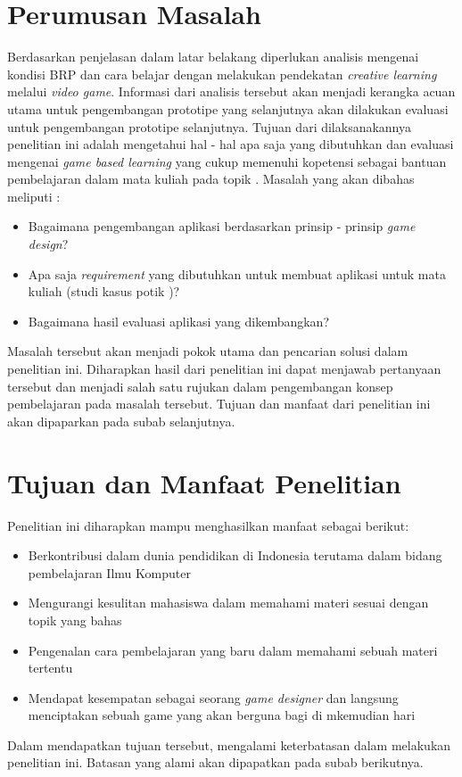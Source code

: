 \section{Perumusan Masalah}
Berdasarkan penjelasan dalam latar belakang diperlukan analisis mengenai kondisi BRP dan cara belajar dengan melakukan pendekatan \textit{creative learning} melalui \textit{video game}. Informasi dari analisis tersebut akan menjadi kerangka acuan utama untuk pengembangan prototipe \game yang selanjutnya akan dilakukan evaluasi untuk pengembangan prototipe selanjutnya.
\linebreak\linebreak
Tujuan dari dilaksanakannya penelitian ini adalah mengetahui hal - hal apa saja yang dibutuhkan dan evaluasi mengenai \textit{game based learning} yang cukup memenuhi kopetensi sebagai bantuan pembelajaran dalam mata kuliah \ddp  pada topik \topik. Masalah yang akan dibahas meliputi :
\begin{itemize}
	\item Bagaimana pengembangan aplikasi \game berdasarkan prinsip - prinsip \textit{game design}?
	\item Apa saja \textit{requirement} yang dibutuhkan untuk membuat aplikasi \game untuk mata kuliah \ddp (studi kasus potik \topik)?
	\item Bagaimana hasil evaluasi aplikasi \game yang dikembangkan?
\end{itemize}
Masalah tersebut akan menjadi pokok utama dan pencarian solusi dalam penelitian ini. Diharapkan hasil dari penelitian ini dapat menjawab pertanyaan tersebut dan menjadi salah satu rujukan dalam pengembangan konsep pembelajaran pada masalah tersebut. Tujuan dan manfaat dari penelitian ini akan dipaparkan pada subab selanjutnya.

\section{Tujuan dan Manfaat Penelitian}
Penelitian ini diharapkan mampu menghasilkan manfaat sebagai berikut:
\begin{itemize}
	\item Berkontribusi dalam dunia pendidikan di Indonesia terutama dalam bidang pembelajaran Ilmu Komputer
	\item Mengurangi kesulitan mahasiswa dalam memahami materi sesuai dengan topik yang \saya bahas
	\item Pengenalan cara pembelajaran yang baru dalam memahami sebuah materi tertentu
	\item Mendapat kesempatan sebagai seorang \textit{game designer} dan langsung menciptakan sebuah game yang akan berguna bagi \saya di mkemudian hari
\end{itemize}
Dalam mendapatkan tujuan tersebut, \Saya mengalami keterbatasan dalam melakukan penelitian ini. Batasan yang \saya alami akan dipapatkan pada subab berikutnya.

